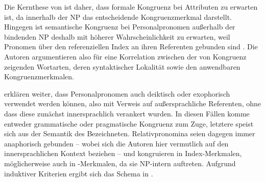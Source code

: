 Die Kernthese von \citet{wechslerzlatic2003} ist daher, dass formale Kongruenz
bei Attributen zu erwarten ist, da innerhalb der NP 
das entscheidende Kongruenzmerkmal darstellt. Hingegen ist semantische
Kongruenz bei Personalpronomen außerhalb der bindenden NP deshalb mit höherer
Wahrscheinlichkeit zu erwarten, weil Pronomen über den referenziellen Index an
ihren Referenten gebunden sind \autocite[89--91]{wechslerzlatic2003}. Die
Autoren argumentieren also für eine Korrelation zwischen der
 von Kongruenz zeigenden Wortarten, deren
syntaktischer Lokalität sowie den anwendbaren Kongruenz\-merkmalen.

\citet[89]{wechslerzlatic2003} erklären weiter, dass Personalpronomen auch
deiktisch oder exophorisch verwendet werden können, also mit Verweis auf
außersprachliche Referenten, ohne dass diese zunächst innersprachlich
verankert wurden. In diesen Fällen komme entweder grammatische
oder pragmatische Kongruenz zum Zuge, letztere speist sich aus der Semantik des
Bezeichneten. Relativpronomina seien dagegen immer anaphorisch
gebunden -- wobei sich die Autoren hier vermutlich auf den innersprachlichen
Kontext beziehen -- und kongruieren in Index-Merkmalen, möglicherweise auch in
-Merkmalen, da sie NP-intern auftreten. Aufgrund induktiver
Kriterien ergibt sich das Schema in .

